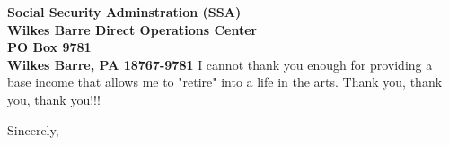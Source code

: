 \documentclass[11pt]{letter} %
\begin{document}
\begin{letter}{\large \bfseries Social Security Adminstration (SSA) \\ Wilkes Barre Direct Operations Center \\ PO Box 9781 \\ Wilkes Barre, PA 18767-9781}
I cannot thank you enough for providing a base income that allows me to "retire" into a life in the arts. Thank you, thank you, thank you!!!

\closing{Sincerely,}

\end{letter}
\end{document}
